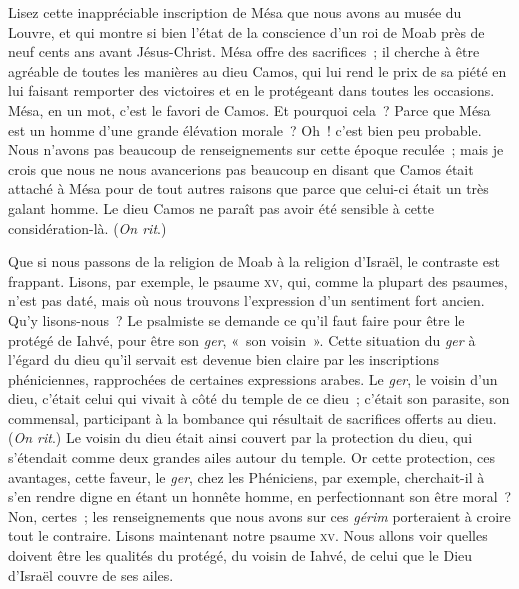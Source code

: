 \documentclass[french,twoside]{book} %
\newcommand\orgName[1]{#1}
\newcommand\persName[1]{#1}
\newcommand\placeName[1]{#1}
\begin{document}
Lisez cette inappréciable inscription de {\persName Mésa} que nous avons au {\orgName musée du Louvre}, et qui montre si bien l’état de la conscience d’un roi de Moab près de neuf cents ans avant Jésus-Christ. {\persName Mésa} offre des sacrifices ; il cherche à être agréable de toutes les manières au {\persName dieu Camos}, qui lui rend le prix de sa piété en lui faisant remporter des victoires et en le protégeant dans toutes les occasions. {\persName Mésa}, en un mot, c’est le favori de {\persName Camos}. Et pourquoi cela ? Parce que {\persName Mésa} est un homme d’une grande élévation morale ? Oh ! c’est bien peu probable. Nous n’avons pas beaucoup de renseignements sur cette époque reculée ; mais je crois que nous ne nous avancerions pas beaucoup en disant que {\persName Camos} était attaché à {\persName Mésa} pour de tout autres raisons que parce que celui-ci était un très galant homme. Le {\persName dieu Camos} ne paraît pas avoir été sensible à cette considération-là. ({\itshape On rit}.)\par
Que si nous passons de la religion de {\placeName Moab} à la religion d’{\placeName Israël}, le contraste est frappant. Lisons, par exemple, le psaume \textsc{xv}, qui, comme la plupart des psaumes, n’est pas daté, mais où nous trouvons l’expression d’un sentiment fort ancien. Qu’y lisons-nous ? Le psalmiste se demande ce qu’il faut faire pour être le protégé de {\persName Iahvé}, pour être son {\itshape ger}, « son voisin ». Cette situation du {\itshape ger} à l’égard du dieu qu’il servait est devenue bien claire par les inscriptions phéniciennes, rapprochées de certaines expressions arabes. Le {\itshape ger}, le voisin d’un dieu, c’était celui qui vivait à côté du temple de ce dieu ; c’était son parasite, son commensal, participant à la bombance qui résultait de sacrifices offerts au dieu. ({\itshape On rit}.) Le voisin du dieu était ainsi couvert par la protection du dieu, qui s’étendait comme deux grandes ailes autour du temple. Or cette protection, ces avantages, cette faveur, le {\itshape ger}, chez les {\orgName Phéniciens}, par exemple, cherchait-il à s’en rendre digne en étant un honnête homme, en perfectionnant son être moral ? Non, certes ; les renseignements que nous avons sur ces {\itshape gérim} porteraient à croire tout le contraire. Lisons maintenant notre psaume \textsc{xv}. Nous allons voir quelles doivent être les qualités du protégé, du voisin de {\persName Iahvé}, de celui que le {\persName Dieu d’Israël} couvre de ses ailes.\par
\end{document}

